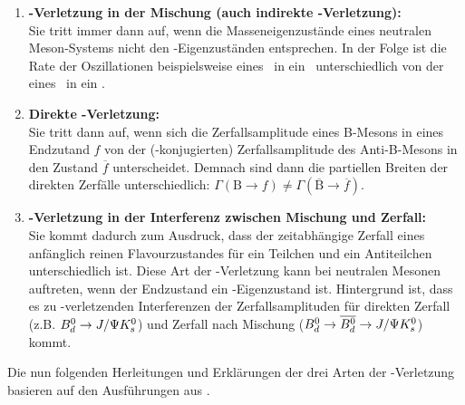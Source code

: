 \begin{enumerate}
\item \textbf{\boldmath\CP-Verletzung in der Mischung (auch indirekte \CP-Verletzung):\unboldmath} \\
      Sie tritt immer dann auf, wenn die Masseneigenzustände eines neutralen Meson-Systems nicht den \CP-Eigenzuständen entsprechen. In der Folge ist die Rate der Oszillationen beispielsweise eines \Bd\ in ein \Bdbar\ unterschiedlich von der eines \Bdbar\ in ein \Bd.
\item \textbf{Direkte \boldmath\CP-Verletzung:\unboldmath} \\
      Sie tritt dann auf, wenn sich die Zerfallsamplitude eines B-Mesons in eines Endzutand $f$ von der (\CP-konjugierten) Zerfallsamplitude des Anti-B-Mesons in den Zustand $\overline{f}$ unterscheidet. Demnach sind dann die partiellen Breiten der direkten Zerfälle unterschiedlich: $\Gamma (\text{B} \rightarrow f) \neq \Gamma (\overline{\text{B}} \rightarrow \overline{f})$.
\item \textbf{\boldmath\CP-Verletzung in der Interferenz zwischen Mischung und Zerfall:\unboldmath} \\
      Sie kommt dadurch zum Ausdruck, dass der zeitabhängige Zerfall eines anfänglich reinen Flavourzustandes für ein Teilchen und ein Antiteilchen unterschiedlich ist. Diese Art der \CP-Verletzung kann bei neutralen Mesonen auftreten, wenn der Endzustand ein \CP-Eigenzustand ist. Hintergrund ist, dass es zu \CP-verletzenden Interferenzen der Zerfallsamplituden für direkten Zerfall (z.B. $\text{$B_d^0$} \rightarrow J/\Psi K_s^0$) und Zerfall nach Mischung ($\text{$B_d^0$} \rightarrow \text{$\overline{B_d^0}$} \rightarrow J/\Psi K_s^0$) kommt.
\end{enumerate}
Die nun folgenden Herleitungen und Erklärungen der drei Arten der \CP-Ver\-let\-zung basieren auf den Ausführungen aus \cite{kleinknecht}.

